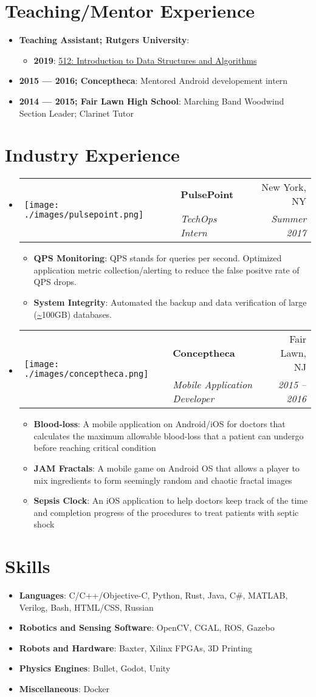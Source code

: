 \documentclass[letterpaper,11pt]{article}
\makeatletter
\newcommand{\resumeItem}[2]{
\item\small{
		\textbf{#1}{: #2 \vspace{-2pt}}
	}
}
\newcommand{\resumeSubheading}[5]{
	\vspace{-1pt}\item
	\begin{tabular*}{0.97\textwidth}[t]{ll@{\extracolsep{\fill}}r}
		\multirow{2}{*}{#1} & \textbf{#2} & #3 \\
				    & \textit{\small#4} & \textit{\small #5} \\
	\end{tabular*}\vspace{-5pt}
}
\newcommand{\resumeSubItem}[2]{\resumeItem{#1}{#2}\vspace{-4pt}}
\newcommand{\resumeSubHeadingListStart}{\begin{itemize}[leftmargin=*,label=]}
\newcommand{\resumeSubHeadingListEnd}{\end{itemize}}
\newcommand{\resumeItemListStart}{\begin{itemize}[label=$\bullet$]}
\newcommand{\resumeItemListEnd}{\end{itemize}\vspace{-5pt}}
\makeatother
\begin{document}
\section{Teaching/Mentor Experience}
\resumeSubHeadingListStart
\resumeItem{Teaching Assistant; Rutgers University}{}
\resumeItemListStart
\resumeItem{2019}{\href{https://www.cs.rutgers.edu/academics/graduate/course-synopses/course-details/16-198-512-introduction-to-data-structures-and-algorithms}{512: Introduction to Data Structures and Algorithms}}
\resumeItemListEnd
\resumeItem{2015 --- 2016; Conceptheca}
{Mentored Android developement intern}
\resumeItem{2014 --- 2015; Fair Lawn High School}
{Marching Band Woodwind Section Leader; Clarinet Tutor}
\resumeSubHeadingListEnd

\section{Industry Experience}
\resumeSubHeadingListStart
\resumeSubheading
{\texttt{[image: ./images/pulsepoint.png]}}
{PulsePoint}{New York, NY}
{TechOps Intern}{Summer 2017}
\resumeItemListStart
\resumeItem{QPS Monitoring}
{QPS stands for queries per second. Optimized application metric collection/alerting to reduce the false positve rate of QPS drops.}
\resumeItem{System Integrity}
{Automated the backup and data verification of large (\url{~}100GB) databases.}
\resumeItemListEnd

\resumeSubheading
{\texttt{[image: ./images/conceptheca.png]}}
{Conceptheca}{Fair Lawn, NJ}
{Mobile Application Developer}{2015 -- 2016}
\resumeItemListStart
\resumeItem{Blood-loss}
{A mobile application on Android/iOS for doctors that calculates the maximum allowable blood-loss that a patient can undergo before reaching critical condition}
\resumeItem{JAM Fractals}
{A mobile game on Android OS that allows a player to mix ingredients to form seemingly random and chaotic fractal images}
\resumeItem{Sepsis Clock}
{An iOS application to help doctors keep track of the time and completion progress of the procedures to treat patients with septic shock}
\resumeItemListEnd
\resumeSubHeadingListEnd

\section{Skills}
\resumeSubHeadingListStart
\resumeSubItem{Languages}
{C/C++/Objective-C, Python, Rust, Java, C\#, MATLAB, Verilog, Bash, HTML/CSS, Russian}
\resumeSubItem{Robotics and Sensing Software}{OpenCV, CGAL, ROS, Gazebo}
\resumeSubItem{Robots and Hardware}{Baxter, Xilinx FPGAs, 3D Printing}
\resumeSubItem{Physics Engines}{Bullet, Godot, Unity}
\resumeSubItem{Miscellaneous}{Docker}
\resumeSubHeadingListEnd
\end{document}
